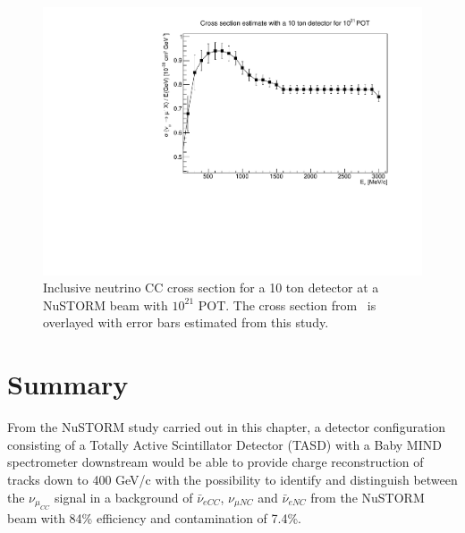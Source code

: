 \begin{figure}[h!]
\centering
\includegraphics[width=.9\textwidth]{figures/NeutrinoChap/NuSTORM/CrossSecEstimateNew.pdf}
\caption{Inclusive neutrino CC cross section for a 10 ton detector at a NuSTORM beam with $10^{21}$ POT. The cross section from~ is overlayed with error bars estimated from this study.}

\label{fig:crossSecEst}
\end{figure}







\section{Summary}
From the NuSTORM study carried out in this chapter, a detector configuration consisting of a Totally Active Scintillator Detector (TASD) with a Baby MIND spectrometer downstream would be able to provide charge reconstruction of tracks down to 400 GeV/c with the possibility to identify and distinguish between the $\nu_{\mu_{CC}}$ signal in a background of $\bar{\nu}_{eCC}$, $\nu_{\mu NC}$ and $\bar{\nu}_{eNC}$ from the NuSTORM beam with 84\% efficiency and contamination of 7.4\%.



